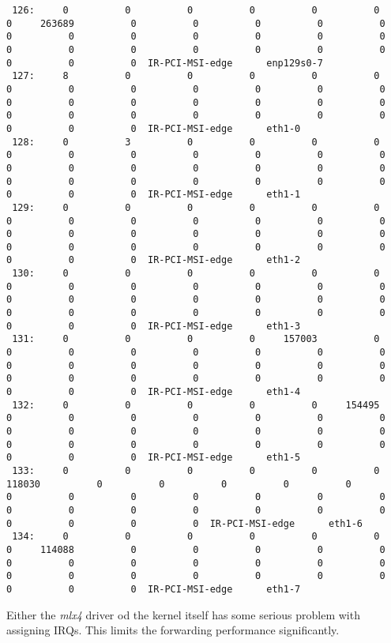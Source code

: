\begin{lstlisting}
 126:     0          0          0          0          0          0          0     263689          0          0          0          0          0          0          0          0          0          0          0          0          0          0          0          0          0          0          0          0          0          0  IR-PCI-MSI-edge      enp129s0-7
 127:     8          0          0          0          0          0          0          0          0          0          0          0          0          0          0          0          0          0          0          0          0          0          0          0          0          0          0          0          0          0  IR-PCI-MSI-edge      eth1-0
 128:     0          3          0          0          0          0          0          0          0          0          0          0          0          0          0          0          0          0          0          0          0          0          0          0          0          0          0          0          0          0  IR-PCI-MSI-edge      eth1-1
 129:     0          0          0          0          0          0          0          0          0          0          0          0          0          0          0          0          0          0          0          0          0          0          0          0          0          0          0          0          0          0  IR-PCI-MSI-edge      eth1-2
 130:     0          0          0          0          0          0          0          0          0          0          0          0          0          0          0          0          0          0          0          0          0          0          0          0          0          0          0          0          0          0  IR-PCI-MSI-edge      eth1-3
 131:     0          0          0          0     157003          0          0          0          0          0          0          0          0          0          0          0          0          0          0          0          0          0          0          0          0          0          0          0          0          0  IR-PCI-MSI-edge      eth1-4
 132:     0          0          0          0          0     154495          0          0          0          0          0          0          0          0          0          0          0          0          0          0          0          0          0          0          0          0          0          0          0          0  IR-PCI-MSI-edge      eth1-5
 133:     0          0          0          0          0          0     118030          0          0          0          0          0          0          0          0          0          0          0          0          0          0          0          0          0          0          0          0          0          0          0  IR-PCI-MSI-edge      eth1-6
 134:     0          0          0          0          0          0          0     114088          0          0          0          0          0          0          0          0          0          0          0          0          0          0          0          0          0          0          0          0          0          0  IR-PCI-MSI-edge      eth1-7
\end{lstlisting}

Either the {\it{mlx4}} driver od the kernel itself has some serious problem with assigning IRQs.
This limits the forwarding performance significantly.
